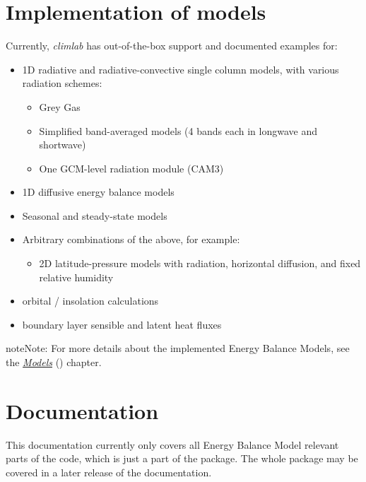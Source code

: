 \documentclass[a4paper,10pt,english]{sphinxmanual}
\begin{document}
\section{Implementation of models}
\label{intro:implementation-of-models}
Currently, \emph{climlab} has out-of-the-box support and documented examples for:
\begin{itemize}
\item {} 
1D radiative and radiative-convective single column models, with various radiation schemes:
\begin{itemize}
\item {} 
Grey Gas

\item {} 
Simplified band-averaged models (4 bands each in longwave and shortwave)

\item {} 
One GCM-level radiation module (CAM3)

\end{itemize}

\item {} 
1D diffusive energy balance models

\item {} 
Seasonal and steady-state models

\item {} 
Arbitrary combinations of the above, for example:
\begin{itemize}
\item {} 
2D latitude-pressure models with radiation, horizontal diffusion, and fixed relative humidity

\end{itemize}

\item {} 
orbital / insolation calculations

\item {} 
boundary layer sensible and latent heat fluxes

\end{itemize}

\begin{notice}{note}{Note:}
For more details about the implemented Energy Balance Models, see the {\hyperref[models:models]{\emph{Models}}} () chapter.
\end{notice}


\section{Documentation}
\label{intro:documentation}
This documentation currently only covers all Energy Balance Model relevant parts of the code, which is just a part of the package. The whole package may be covered in a later release of the documentation.
\end{document}

